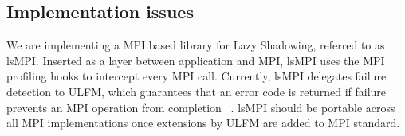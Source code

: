 \subsection{Implementation issues}

%

We are implementing a MPI based library for Lazy Shadowing, referred to as lsMPI. Inserted as a layer between application and MPI, lsMPI uses the MPI profiling hooks to intercept every MPI call. Currently, lsMPI 
delegates failure detection to ULFM, which guarantees that an error code is returned if failure prevents 
an MPI operation from completion
~\cite{Bland:2012:EUF:2404033.2404064,bland2013post}. 
lsMPI should be portable across all MPI implementations once extensions by ULFM are added to MPI standard.

